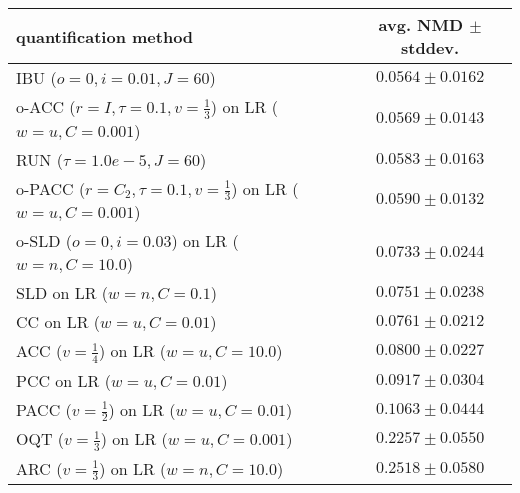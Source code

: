\begin{tabular}{lc}
  \toprule
  quantification method & avg. NMD $\pm$ stddev. \\
  \midrule
  IBU ($o=0, i=0.01, J=60$) & $\mathbf{0.0564 \pm 0.0162}$ \\
  o-ACC ($r=I, \tau=0.1, v=\frac{1}{3}$) on LR ($w=u, C=0.001$) & $\mathbf{0.0569 \pm 0.0143}$ \\
  RUN ($\tau=1.0e-5, J=60$) & $0.0583 \pm 0.0163$ \\
  o-PACC ($r=C_2, \tau=0.1, v=\frac{1}{3}$) on LR ($w=u, C=0.001$) & $0.0590 \pm 0.0132$ \\
  o-SLD ($o=0, i=0.03$) on LR ($w=n, C=10.0$) & $0.0733 \pm 0.0244$ \\
  SLD on LR ($w=n, C=0.1$) & $0.0751 \pm 0.0238$ \\
  CC on LR ($w=u, C=0.01$) & $0.0761 \pm 0.0212$ \\
  ACC ($v=\frac{1}{4}$) on LR ($w=u, C=10.0$) & $0.0800 \pm 0.0227$ \\
  PCC on LR ($w=u, C=0.01$) & $0.0917 \pm 0.0304$ \\
  PACC ($v=\frac{1}{2}$) on LR ($w=u, C=0.01$) & $0.1063 \pm 0.0444$ \\
  OQT ($v=\frac{1}{3}$) on LR ($w=u, C=0.001$) & $0.2257 \pm 0.0550$ \\
  ARC ($v=\frac{1}{3}$) on LR ($w=n, C=10.0$) & $0.2518 \pm 0.0580$ \\
  \bottomrule
\end{tabular}
